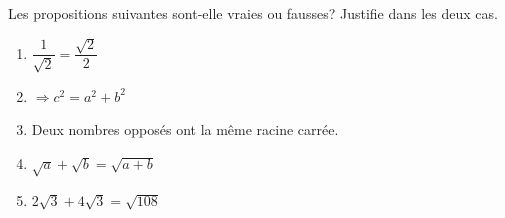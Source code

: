 %
%
    Les propositions suivantes sont-elle vraies ou fausses? Justifie dans les deux cas.
    \begin{enumerate}
        \item $\dfrac{1}{\sqrt{2}}=\dfrac{\sqrt{2}}{2}$
        \item  $\Rightarrow c^2 = a^2+b^2$
        \item Deux nombres opposés ont la même racine carrée.
        \item $\sqrt{a} + \sqrt{b} = \sqrt{a+b}$
        \item $2\sqrt{3} + 4\sqrt{3} = \sqrt{108}$
    \end{enumerate}
